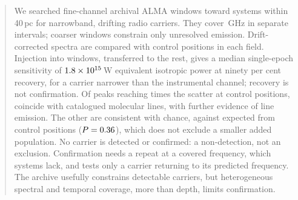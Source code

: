 \begin{abstract}
We searched \NWinA{} fine-channel archival ALMA windows toward
\NSysClassA{} systems within 40\,pc for narrowband, drifting radio carriers.
They cover \CvUnionA\,GHz in \CovNIslands{} separate intervals; \NWinB{}
coarser windows constrain only unresolved emission. Drift-corrected spectra
are compared with control positions in each field. Injection into
\SensNInj{} windows, transferred to the rest, gives a median single-epoch
sensitivity of $\EirpNinetySysMedA$\,W equivalent isotropic power at ninety
per cent recovery, for a carrier narrower than the instrumental channel;
recovery is not confirmation. Of \CsNCross{} peaks reaching
\StageNullTrig{} times the scatter at control positions, \MkNCoinc{}
coincide with catalogued molecular lines, \LnAttrSupp{} with further
evidence of line emission. The other \CeObs{} are consistent with chance,
against \CeExp{} expected from control positions ($P=\CeProbNull$),
which does not exclude a smaller added population. No carrier is detected or
confirmed: a non-detection, not an exclusion. Confirmation needs a repeat at
a covered frequency, which \ZcNoRepSys{} systems lack, and tests only a
carrier returning to its predicted frequency. The archive usefully
constrains detectable carriers, but heterogeneous spectral and temporal
coverage, more than depth, limits confirmation.
\end{abstract}


